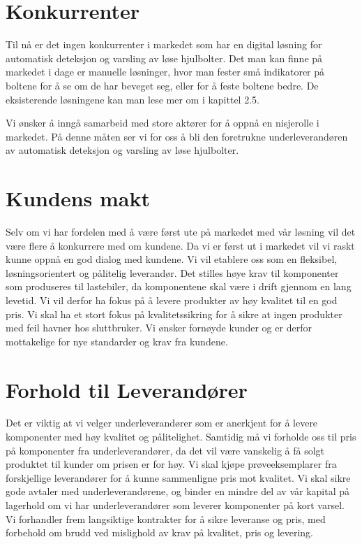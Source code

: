 \section{Konkurrenter}
Til nå er det ingen konkurrenter i markedet som har en digital løsning for 
automatisk deteksjon og varsling av løse hjulbolter. Det man kan finne på 
markedet i dage er manuelle løsninger, hvor man fester små indikatorer på 
boltene for å se om de har beveget seg, eller for å feste boltene bedre. De 
eksisterende løsningene kan man lese mer om i kapittel 2.5.

Vi ønsker å inngå samarbeid med store aktører for å oppnå en nisjerolle i 
markedet. På denne måten ser vi for oss å bli den foretrukne 
underleverandøren av automatisk deteksjon og varsling av løse hjulbolter.

\section{Kundens makt}
Selv om vi har fordelen med å være først ute på markedet med vår løsning vil 
det være flere å konkurrere med om kundene. Da vi er først ut i markedet vil 
vi raskt kunne oppnå en god dialog med kundene. Vi vil etablere oss som en 
fleksibel, løsningsorientert og pålitelig leverandør. Det stilles høye krav 
til komponenter som produseres til lastebiler, da komponentene skal være i 
drift gjennom en lang levetid. Vi vil derfor ha fokus på å levere produkter 
av høy kvalitet til en god pris. Vi skal ha et stort fokus på 
kvalitetssikring for å sikre at ingen produkter med feil havner hos 
sluttbruker. Vi ønsker fornøyde kunder og er derfor mottakelige for nye 
standarder og krav fra kundene. 

\section{Forhold til Leverandører}
Det er viktig at vi velger underleverandører som er anerkjent for å levere 
komponenter med høy kvalitet og pålitelighet. Samtidig må vi forholde oss til 
pris på komponenter fra underleverandører, da det vil være vanskelig å få 
solgt produktet til kunder om prisen er for høy. Vi skal kjøpe 
prøveeksemplarer fra forskjellige leverandører for å kunne sammenligne pris 
mot kvalitet. Vi skal sikre gode avtaler med underleverandørene, og binder en 
mindre del av vår kapital på lagerhold om vi har underleverandører som 
leverer komponenter på kort varsel. Vi forhandler frem langsiktige kontrakter 
for å sikre leveranse og pris, med forbehold om brudd ved mislighold av krav 
på kvalitet, pris og levering. 

